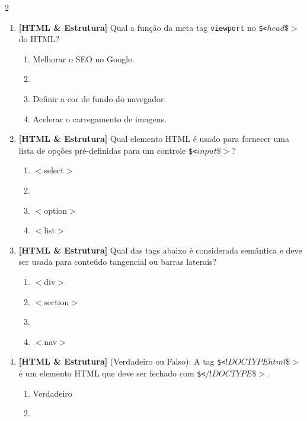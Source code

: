 \documentclass[a4paper,10pt]{article}
\begin{document}
\begin{multicols*}{2}
\begin{enumerate}[label=\textbf{\arabic*.}, leftmargin=*]
\item \textbf{[HTML \& Estrutura]} Qual a função da meta tag \texttt{viewport} no \texttt{\$<$head\$>$} do HTML?
\begin{enumerate}[label=(\alph*), noitemsep]
  \item Melhorar o SEO no Google.
  \item {}
  \item Definir a cor de fundo do navegador.
  \item Acelerar o carregamento de imagens.
\end{enumerate}

\item \textbf{[HTML \& Estrutura]} Qual elemento HTML é usado para fornecer uma lista de opções pré-definidas para um controle \texttt{\$<$input\$>$}?
\begin{enumerate}[label=(\alph*), noitemsep]
  \item $<$select$>$
  \item {}
  \item $<$option$>$
  \item $<$list$>$
\end{enumerate}

\item \textbf{[HTML \& Estrutura]} Qual das tags abaixo é considerada semântica e deve ser usada para conteúdo tangencial ou barras laterais?
\begin{enumerate}[label=(\alph*), noitemsep]
  \item $<$div$>$
  \item $<$section$>$
  \item {}
  \item $<$nav$>$
\end{enumerate}

\item \textbf{[HTML \& Estrutura]} (Verdadeiro ou Falso): A tag \texttt{\$<$!DOCTYPE html\$>$} é um elemento HTML que deve ser fechado com \texttt{\$<$/!DOCTYPE\$>$}.
\begin{enumerate}[label=(\alph*), noitemsep]
  \item Verdadeiro
  \item {}
\end{enumerate}

\end{enumerate}
\end{multicols*}
\newpage
\end{document}
